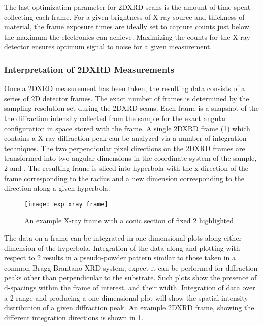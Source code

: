 The last optimization parameter for 2DXRD scans is the amount of time spent collecting each frame.
For a given brightness of X-ray source and thickness of material, the frame exposure times are ideally set to capture counts just below the maximum the electronics can achieve.
Maximizing the counts for the X-ray detector ensures optimum signal to noise for a given measurement.

\subsubsection{Interpretation of 2DXRD Measurements} Once a 2DXRD measurement has been taken, the resulting data consists of a series of 2D detector frames.
The exact number of frames is determined by the sampling resolution set during the 2DXRD scans.
Each frame is a snapshot of the the diffraction intensity collected from the sample for the exact angular configuration in space stored with the frame.
A single 2DXRD frame (\cref{fig:exp_xray_frame}) which contains a X-ray diffraction peak can be analyzed via a number of integration techniques.
The two perpendicular pixel directions on the 2DXRD frames are transformed into two angular dimensions in the coordinate system of the sample, 2\straighttheta{} and \textchi{} \cite{He2009}.
The resulting frame is sliced into hyperbola with the x-direction of the frame corresponding to the radius and a new dimension \textchi{} corresponding to the direction along a given hyperbola.
\begin{figure}
 \centering \texttt{[image: exp\_xray\_frame]}
 \caption[Example 2DXRD frame]{\label{fig:exp_xray_frame}An example X-ray frame with a conic section of fixed 2\straighttheta{} highlighted}
\end{figure}

The data on a frame can be integrated in one dimensional plots along either dimension of the hyperbola.
Integration of the data along \textchi{} and plotting with respect to 2\straighttheta{} results in a pseudo-powder pattern similar to those taken in a common Bragg-Brantano XRD system, expect it can be performed for diffraction peaks other than perpendicular to the substrate.
Such plots show the presence of d-spacings within the frame of interest, and their width.
Integration of data over a 2\straighttheta{} range and producing a one dimensional plot will show the spatial intensity distribution of a given diffraction peak.
An example 2DXRD frame, showing the different integration directions is shown in \cref{fig:exp_xray_frame}.

